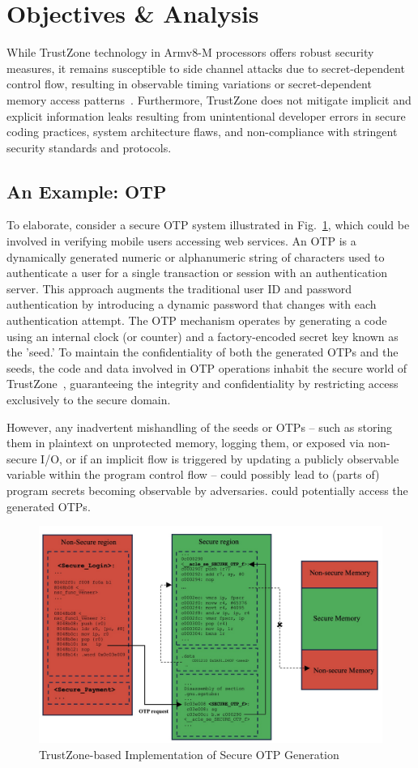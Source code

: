 \section{Objectives \& Analysis} \label{sect:design}
%
While TrustZone technology in Armv8-M processors offers robust security
measures, it remains susceptible to side channel attacks due to
secret-dependent control flow, resulting in observable timing variations or
secret-dependent memory access patterns~\cite{armdeveloper}. Furthermore,
TrustZone does not mitigate implicit and explicit information leaks
resulting from unintentional developer errors in secure coding practices,
system architecture flaws, and non-compliance with stringent security
standards and protocols.

\subsection{An Example: OTP}

To elaborate, consider a secure \ac{OTP} system illustrated in
Fig.~\ref{fig:OTP}, which could be involved in verifying mobile users
accessing web services. An \ac{OTP} is a dynamically generated numeric or
alphanumeric string of characters used to authenticate a user for a single
transaction or session with an authentication server. This approach
augments the traditional user ID and password authentication by introducing
a dynamic password that changes with each authentication attempt. The
\ac{OTP} mechanism operates by generating a code using an internal clock
(or counter) and a factory-encoded secret key known as the 'seed.' To
maintain the confidentiality of both the generated \acp{OTP} and the seeds,
the code and data involved in \ac{OTP} operations inhabit the secure world
of TrustZone~\cite{trustotp}, guaranteeing the integrity and
confidentiality by restricting access exclusively to the secure domain.

However, any inadvertent mishandling of the seeds or \acp{OTP} -- such as
storing them in plaintext on unprotected memory, logging them, or exposed
via non-secure I/O, or if an implicit flow is triggered by updating a
publicly observable variable within the program control flow -- could
possibly lead to (parts of) program secrets becoming observable by
adversaries.  could potentially access the generated \acp{OTP}.

\begin{figure}
  \centering
  \includegraphics[width=.8\textwidth]{figures/OTP.jpg}
  \caption{TrustZone-based Implementation of Secure OTP Generation}
  \label{fig:OTP}
\end{figure}

